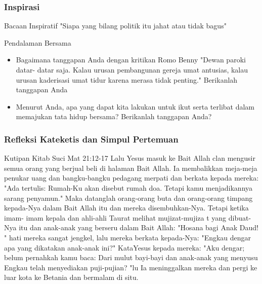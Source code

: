 \documentclass[11pt]{beamer}
\begin{document}
\begin{frame}
	\frametitle{Inspirasi}
	\begin{block}{Bacaan Inspiratif}
		"Siapa yang bilang politik itu jahat atau tidak bagus"
	\end{block}
 	\pause
	\begin{block}{Pendalaman Bersama}
		\begin{itemize}
			\item Bagaimana tanggapan Anda dengan kritikan Romo Benny "Dewan paroki datar-
			datar saja. Kalau urusan pembangunan gereja umat antusias, kalau urusan kaderisasi
			umat tidur karena merasa tidak penting." Berikanlah tanggapan Anda
			\item Menurut Anda, apa yang dapat kita lakukan untuk ikut serta terlibat dalam
			memajukan tata hidup bersama? Berikanlah tanggapan Anda?
		\end{itemize}
	\end{block}
\end{frame}

\begin{frame}
	\frametitle{Refleksi Kateketis dan Simpul Pertemuan}
	\begin{block}{Kutipan Kitab Suci Mat 21:12-17}
	\small Lalu Yesus masuk ke Bait Allah clan mengusir semua orang yang berjual beli di halaman Bait
	Allah. Ia membalikkan meja-meja penukar uang dan bangku-bangku pedagang merpati dan
	berkata kepada mereka: "Ada tertulis: Rumah-Ku akan disebut rumah doa. Tetapi kamu
	menjadikannya sarang penyamun." Maka datanglah orang-orang buta dan orang-orang
	timpang kepada-Nya dalam Bait Allah itu dan mereka disembuhkan-Nya. Tetapi ketika imam-
	imam kepala dan ahli-ahli Taurat melihat mujizat-mujiza t yang dibuat-Nya itu dan anak-anak
	yang berseru dalam Bait Allah: "Hosana bagi Anak Daud! " hati mereka sangat jengkel, lalu
	mereka berkata kepada-Nya: "Engkau dengar apa yang dikatakan anak-anak ini?" KataYesus kepada mereka: "Aku dengar; belum pernahkah kamu baca: Dari mulut bayi-bayi dan
	anak-anak yang menyusu Engkau telah menyediakan puji-pujian? "lu Ia meninggalkan
	mereka dan pergi ke luar kota ke Betania dan bermalam di situ.	
	\end{block}
\end{frame}
\end{document}
